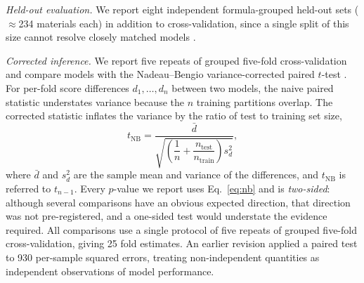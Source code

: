 \documentclass{ieeeaccess}
\begin{document}
\textit{Held-out evaluation.} We report eight independent formula-grouped held-out sets ($\approx$234 materials each) in addition to cross-validation, since a single split of this size cannot resolve closely matched models \cite{varoquaux2018crossvalidation}.

\textit{Corrected inference.} We report five repeats of grouped five-fold cross-validation and compare models with the Nadeau--Bengio variance-corrected paired $t$-test \cite{nadeau2003inference}. For per-fold score differences $d_1,\dots,d_n$ between two models, the naive paired statistic understates variance because the $n$ training partitions overlap. The corrected statistic inflates the variance by the ratio of test to training set size,
\begin{equation}
t_{\mathrm{NB}} = \frac{\bar{d}}
  {\sqrt{\left(\dfrac{1}{n} + \dfrac{n_{\mathrm{test}}}{n_{\mathrm{train}}}\right) s_d^2}},
\label{eq:nb}
\end{equation}
where $\bar{d}$ and $s_d^2$ are the sample mean and variance of the differences, and $t_{\mathrm{NB}}$ is referred to $t_{n-1}$. Every $p$-value we report uses Eq.~\eqref{eq:nb} and is \emph{two-sided}: although several comparisons have an obvious expected direction, that direction was not pre-registered, and a one-sided test would understate the evidence required. All comparisons use a single protocol of five repeats of grouped five-fold cross-validation, giving 25 fold estimates. An earlier revision applied a paired test to 930 per-sample squared errors, treating non-independent quantities as independent observations of model performance.
\end{document}
